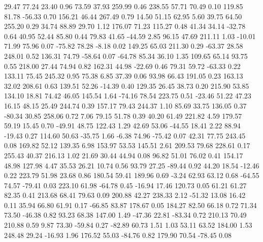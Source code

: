    29.47   77.24   23.40    0.96
   73.59   37.93  259.99    0.46
  238.55   57.71   70.49    0.10
  119.85   81.78  -56.33    0.70
  156.21   46.44  267.49    0.79
   14.50   51.15   62.95    5.60
   39.75   64.50  255.20    0.29
   34.74   88.89   29.70    1.12
  176.07   71.23  115.27    0.48
   41.34   34.14  -32.78    0.64
   40.95   52.44   85.80    0.44
   79.83   41.65  -44.59    2.85
   96.15   47.69  211.11    1.03
  -10.01   71.99   75.96    0.07
  -75.82   78.28   -8.18    0.02
  149.25   65.03  211.30    0.29
  -63.37   28.58  248.01    0.52
  136.31   74.79  -58.64    0.07
  -64.78   85.34   36.10    1.35
  109.65   65.14   93.75    0.55
  218.00   27.44   74.94    0.82
  162.31   44.98  -22.69    0.46
   79.31   59.72  -63.33    0.22
  133.11   75.45  245.32    0.95
   75.38    6.85   37.39    0.06
   93.98   66.43  191.05    0.23
  163.13   32.02  208.61    0.63
  139.51   52.26  -14.39    0.40
  129.35   26.45   38.73    0.20
  215.90   53.85  134.10   18.81
   74.42   46.05  145.54    1.64
  -74.16   78.54  223.75    0.51
  -23.46   51.22   47.23   16.15
   48.15   25.49  244.74    0.39
  157.17   79.43  244.37    1.10
   85.69   33.75  136.05    0.37
  -80.34   30.85  258.06    0.72
    7.06   79.15   51.78    0.39
   40.20   61.49  221.82    4.59
  179.57   59.19   15.45    0.70
  -49.91   48.75  122.43    1.29
   42.69   53.06  -44.55   18.41
    2.22   88.94  -19.43    0.27
  114.60   50.63  -35.75    1.66
   -6.38   74.96  -75.42    0.07
   42.31   77.75  243.45    0.08
  169.82   52.12  139.35    6.98
  153.97   53.53  145.51    2.61
  209.53   79.68  228.61    0.17
  255.43   40.37  216.13    1.02
   21.69   30.44   44.94    0.08
   96.82   51.01   76.02    0.41
  154.17   48.98  127.98    4.47
   35.53   26.21   10.74    0.56
   93.79   27.25  -89.44    0.92
   44.20   18.54  -12.46    0.22
  223.79   51.98   23.68    0.86
  180.54   59.41  189.96    0.69
   -3.24   62.93   63.12    0.68
  -64.55   74.57  -79.41    0.03
  223.10   61.98  -64.78    0.45
  -16.94   17.46  120.73    0.05
   61.21   61.27   82.35    0.41
  213.68   68.41   79.63    0.09
  200.88   42.27  238.33    2.12
  -51.32   13.08   16.42    0.11
   35.94   66.80   61.91    0.17
  -66.85   83.87  178.67    0.05
  184.27   82.50   66.18    0.72
   71.34   73.50  -46.38    0.82
   93.23   68.38  147.00    1.49
  -47.36   22.81  -83.34    0.72
  210.13   70.49  210.88    0.59
    9.87   73.30  -59.84    0.27
  -82.89   60.73    1.51    1.03
   53.11   63.52  184.00    1.53
  248.48   29.24  -16.93    1.96
  176.52   55.03  -84.76    0.82
  179.90   70.54  -78.45    0.08
